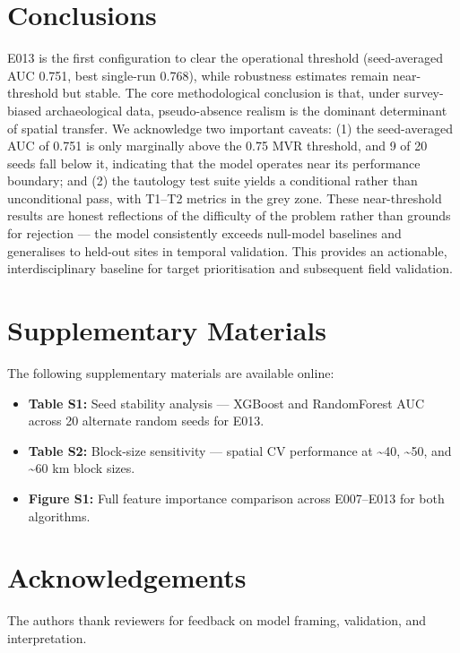 \documentclass[12pt]{article}
\begin{document}
\section{Conclusions}

E013 is the first configuration to clear the operational threshold (seed-averaged AUC 0.751, best single-run 0.768), while robustness estimates remain near-threshold but stable.
The core methodological conclusion is that, under survey-biased archaeological data, pseudo-absence realism is the dominant determinant of spatial transfer.
We acknowledge two important caveats: (1) the seed-averaged AUC of 0.751 is only marginally above the 0.75 MVR threshold, and 9 of 20 seeds fall below it, indicating that the model operates near its performance boundary; and (2) the tautology test suite yields a conditional rather than unconditional pass, with T1--T2 metrics in the grey zone.
These near-threshold results are honest reflections of the difficulty of the problem rather than grounds for rejection --- the model consistently exceeds null-model baselines and generalises to held-out sites in temporal validation.
This provides an actionable, interdisciplinary baseline for target prioritisation and subsequent field validation.

\section*{Supplementary Materials}

The following supplementary materials are available online:
\begin{itemize}
  \item \textbf{Table S1:} Seed stability analysis --- XGBoost and RandomForest AUC across 20 alternate random seeds for E013.
  \item \textbf{Table S2:} Block-size sensitivity --- spatial CV performance at \textasciitilde{}40, \textasciitilde{}50, and \textasciitilde{}60 km block sizes.
  \item \textbf{Figure S1:} Full feature importance comparison across E007--E013 for both algorithms.
\end{itemize}

\section*{Acknowledgements}

The authors thank reviewers for feedback on model framing, validation, and interpretation.
\end{document}
